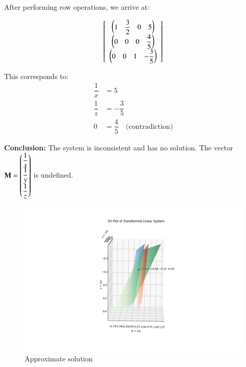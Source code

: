 \documentclass[journal]{IEEEtran}
\begin{document}
After performing row operations, we arrive at:

\[
\left[
\begin{array}{c}
\begin{pmatrix}1 & \dfrac{3}{2} & 0 & 5\end{pmatrix} \\
\begin{pmatrix}0 & 0 & 0 & \dfrac{4}{5}\end{pmatrix} \\
\begin{pmatrix}0 & 0 & 1 & -\dfrac{3}{5}\end{pmatrix}
\end{array}
\right]
\]

This corresponds to:
\[
\begin{aligned}
\dfrac{1}{x} &= 5 \\
\dfrac{1}{z} &= -\dfrac{3}{5} \\
0 &= \dfrac{4}{5} \quad \text{(contradiction)}
\end{aligned}
\]

\vspace{0.3cm}
\textbf{Conclusion:} The system is inconsistent and has no solution.  
The vector \( \mathbf{M} = \begin{pmatrix}\dfrac{1}{x} \\ \dfrac{1}{y} \\ \dfrac{1}{z}\end{pmatrix} \) is undefined.









\begin{figure}[h!]
\centering
\includegraphics[width=1.3\linewidth]{Figs/Fig1.png}
\caption{Approximate solution}
\label{fig:your_label}
\end{figure}
\end{document}
